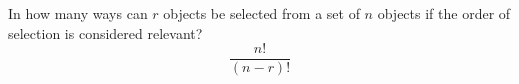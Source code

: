 \item In how many ways can $r$ objects be selected from a set of $n$ objects if the order of selection is considered relevant?
\[ \frac{n!}{(n-r)!} \]